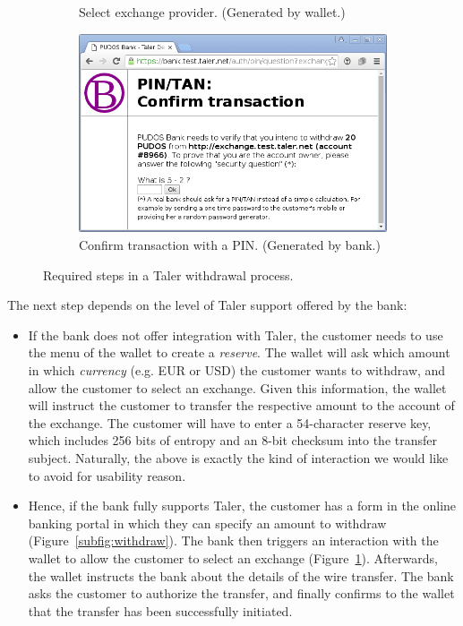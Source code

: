 \documentclass{IEEEtran}
\begin{document}
\begin{figure}
\begin{subfigure}{\linewidth}
\caption{Select exchange provider. (Generated by wallet.)}
\label{subfig:exchange}
\end{subfigure}
\begin{subfigure}{\linewidth}
\includegraphics[width=\linewidth]{figs/bank3a.png}
\caption{Confirm transaction with a PIN. (Generated by bank.)}
\label{subfig:pin}
\end{subfigure}
\caption{Required steps in a Taler withdrawal process.}
\label{fig:withdrawal}
\end{figure}


The next step depends on the level of Taler support offered by the bank:
\begin{itemize}
\item If the bank does not offer integration with Taler, the
  customer needs to use the menu of the wallet to create a {\em reserve}.
  The wallet will ask which amount in which {\em currency} (e.g. EUR
  or USD) the customer wants to withdraw, and allow the customer to
  select an exchange.  Given this information, the wallet will
  instruct the customer to transfer the respective amount to the
  account of the exchange.  The customer will have to enter a
  54-character reserve key, which includes 256 bits of entropy and an
  8-bit checksum into the transfer subject.  Naturally, the above is
  exactly the kind of interaction we would like to avoid for
  usability reason.
\item Hence, if the bank fully supports Taler, the
  customer has a form in the online banking portal in which they can specify
  an amount to withdraw (Figure~\ref{subfig:withdraw}).
  The bank then triggers an interaction with
  the wallet to allow the customer to select an exchange
  (Figure~\ref{subfig:exchange}).  Afterwards,
  the wallet instructs the bank about the details of the wire
  transfer.  The bank asks the customer to authorize the transfer, and
  finally confirms to the wallet that the transfer has been
  successfully initiated.
\end{itemize}
\end{document}

